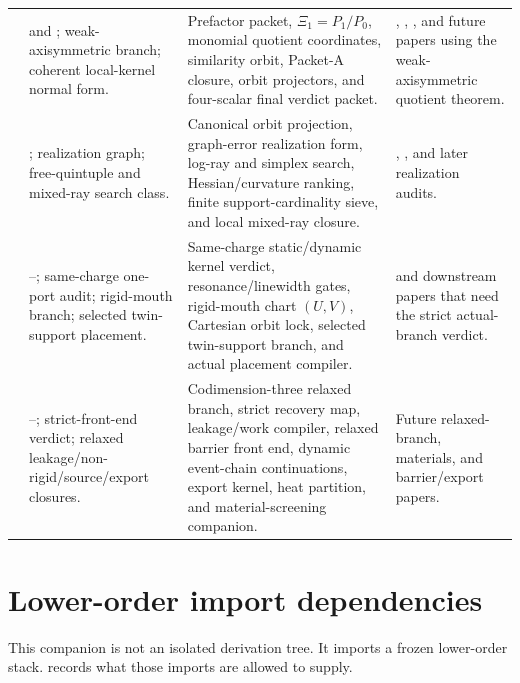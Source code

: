 \begin{longtable}{L{0.11\textwidth}L{0.22\textwidth}L{0.25\textwidth}L{0.28\textwidth}}
\addlinespace
{} &  and ; weak-axisymmetric branch; coherent local-kernel normal form. & Prefactor packet, \(\Xi_1=P_1/P_0\), monomial quotient coordinates, similarity orbit, Packet-A closure, orbit projectors, and four-scalar final verdict packet. & , , , and future papers using the weak-axisymmetric quotient theorem. \\
\addlinespace
{} & ; realization graph; free-quintuple and mixed-ray search class. & Canonical orbit projection, graph-error realization form, log-ray and simplex search, Hessian/curvature ranking, finite support-cardinality sieve, and local mixed-ray closure. & , , and later realization audits. \\
\addlinespace
{} & --; same-charge one-port audit; rigid-mouth branch; selected twin-support placement. & Same-charge static/dynamic kernel verdict, resonance/linewidth gates, rigid-mouth chart \((U,V)\), Cartesian orbit lock, selected twin-support branch, and actual placement compiler. &  and downstream papers that need the strict actual-branch verdict. \\
\addlinespace
{} & --; strict-front-end verdict; relaxed leakage/non-rigid/source/export closures. & Codimension-three relaxed branch, strict recovery map, leakage/work compiler, relaxed barrier front end, dynamic event-chain continuations, export kernel, heat partition, and material-screening companion. & Future relaxed-branch, materials, and barrier/export papers. \\
\bottomrule
\end{longtable}

\section{Lower-order import dependencies}
\label{sec:lower-order-import-dependencies}

This companion is not an isolated derivation tree.  It imports a frozen lower-order stack.   records what those imports are allowed to supply.

